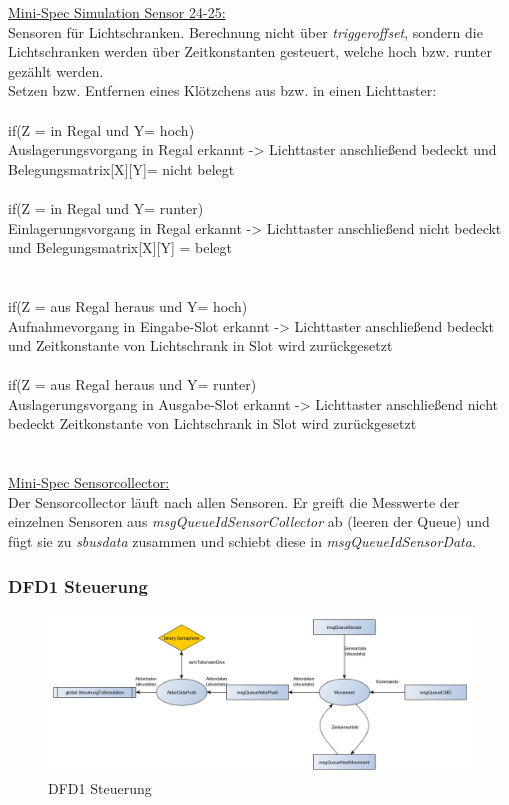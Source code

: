 \underline{Mini-Spec Simulation Sensor 24-25:}\\
Sensoren für Lichtschranken.
Berechnung nicht über \textit{triggeroffset}, sondern die Lichtschranken werden über Zeitkonstanten gesteuert, welche hoch bzw. runter gezählt werden.\\
Setzen bzw. Entfernen eines Klötzchens aus bzw. in einen Lichttaster:\\ \\
if(Z = in Regal und Y= hoch) \\
Auslagerungsvorgang in Regal erkannt -> Lichttaster anschließend bedeckt und Belegungsmatrix[X][Y]= nicht belegt\\
\\
if(Z = in Regal und Y= runter)\\
Einlagerungsvorgang in Regal erkannt -> Lichttaster anschließend nicht bedeckt und Belegungsmatrix[X][Y] = belegt \\
\\
\\
if(Z = aus Regal heraus und Y= hoch)\\
Aufnahmevorgang in Eingabe-Slot erkannt -> Lichttaster anschließend bedeckt und Zeitkonstante von Lichtschrank in Slot wird zurückgesetzt\\
\\
if(Z = aus Regal heraus und Y= runter)\\
Auslagerungsvorgang in Ausgabe-Slot erkannt -> Lichttaster anschließend nicht bedeckt  Zeitkonstante von Lichtschrank in Slot wird zurückgesetzt\ \\
\\
\\
\underline{Mini-Spec Sensorcollector:}\\
Der Sensorcollector läuft nach allen Sensoren. Er  greift die Messwerte der einzelnen Sensoren aus \textit{msgQueueIdSensorCollector} ab (leeren der Queue) und fügt sie zu \textit{sbusdata} zusammen und schiebt diese in \textit{msgQueueIdSensorData}.\\ 


\subsubsection{DFD1 Steuerung}
\begin{figure}[H]
	\centering
  \includegraphics[width=\textwidth]{DFD/dfd1_steuerung.png}
	\caption{DFD1 Steuerung}
	\label{fig3}
\end{figure}

